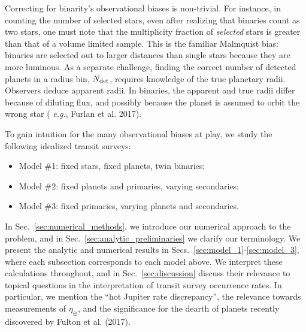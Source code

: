 Correcting for binarity's observational biases is non-trivial.
For instance, in counting the number of selected stars, even after realizing 
that binaries count as two stars, one must note that the multiplicity 
fraction of {\it selected} stars is greater than that of a volume limited 
sample.
This is the familiar Malmquist bias: binaries are selected out to larger 
distances than single stars because they are more luminous.
As a separate challenge, finding the correct number of detected planets in a 
radius bin, $N_{\rm det}$, requires knowledge of the true planetary radii.
Observers deduce apparent radii.
In binaries, the apparent and true radii differ because of diluting flux, 
and possibly because the planet is assumed to orbit the wrong star ({\it 
e.g.}, Furlan et al. 2017).

To gain intuition for the many observational biases at play,
we study the following idealized transit surveys:
\begin{itemize}
    \item Model \#1: fixed stars, fixed planets, twin binaries;
    \item Model \#2: fixed planets and primaries, varying secondaries;
    \item Model \#3: fixed primaries, varying planets and secondaries.
\end{itemize}
In Sec.~\ref{sec:numerical_methods}, we introduce our numerical approach 
to the problem, and in Sec.~\ref{sec:analytic_preliminaries} we clarify our 
terminology.
We present the analytic and numerical results in 
Secs.~\ref{sec:model_1}-\ref{sec:model_3}, where each subsection corresponds 
to each model above.
We interpret these calculations throughout, and in 
Sec.~\ref{sec:discussion} discuss their relevance to topical questions in 
the interpretation of transit survey occurrence rates.
In particular, we mention the ``hot Jupiter rate discrepancy'', the relevance 
towards measurements of $\eta_\oplus$, and the significance for the dearth of 
planets recently discovered by Fulton et al. (2017).
